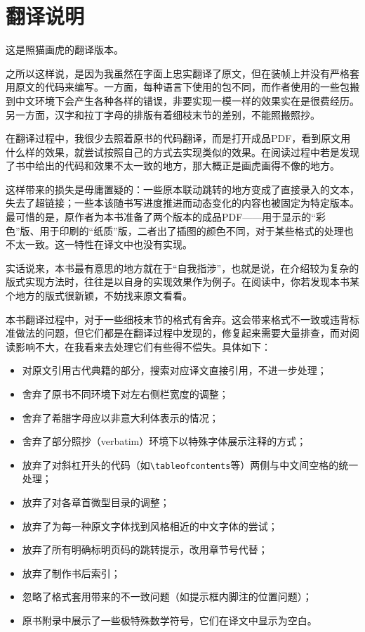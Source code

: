 \chapter*{翻译说明}

这是照猫画虎的翻译版本。

之所以这样说，是因为我虽然在字面上忠实翻译了原文，但在装帧上并没有严格套用原文的代码来编写。一方面，每种语言下使用的包不同，而作者使用的一些包搬到中文环境下会产生各种各样的错误，非要实现一模一样的效果实在是很费经历。另一方面，汉字和拉丁字母的排版有着细枝末节的差别，不能照搬照抄。

在翻译过程中，我很少去照着原书的代码翻译，而是打开成品PDF，看到原文用什么样的效果，就尝试按照自己的方式去实现类似的效果。在阅读过程中若是发现了书中给出的代码和效果不太一致的地方，那大概正是画虎画得不像的地方。

这样带来的损失是毋庸置疑的：一些原本联动跳转的地方变成了直接录入的文本，失去了超链接；一些本该随书写进度推进而动态变化的内容也被固定为特定版本。最可惜的是，原作者为本书准备了两个版本的成品PDF——用于显示的“彩色”版、用于印刷的“纸质”版，二者出了插图的颜色不同，对于某些格式的处理也不太一致。这一特性在译文中也没有实现。

实话说来，本书最有意思的地方就在于“自我指涉”，也就是说，在介绍较为复杂的版式实现方法时，往往是以自身的实现效果作为例子。在阅读中，你若发现本书某个地方的版式很新颖，不妨找来原文看看。

本书翻译过程中，对于一些细枝末节的格式有舍弃。这会带来格式不一致或违背标准做法的问题，但它们都是在翻译过程中发现的，修复起来需要大量排查，而对阅读影响不大，在我看来去处理它们有些得不偿失。具体如下：
\begin{itemize}
    \item 对原文引用古代典籍的部分，搜索对应译文直接引用，不进一步处理；
    \item 舍弃了原书不同环境下对左右侧栏宽度的调整；
    \item 舍弃了希腊字母应以非意大利体表示的情况；
    \item 舍弃了部分照抄（verbatim）环境下以特殊字体展示注释的方式；
    \item 放弃了对斜杠开头的代码（如\verb+\tableofcontents+等）两侧与中文间空格的统一处理；
    \item 放弃了对各章首微型目录的调整；
    \item 放弃了为每一种原文字体找到风格相近的中文字体的尝试；
    \item 放弃了所有明确标明页码的跳转提示，改用章节号代替；
    \item 放弃了制作书后索引；
    \item 忽略了格式套用带来的不一致问题（如提示框内脚注的位置问题）；
    \item 原书附录中展示了一些极特殊数学符号，它们在译文中显示为空白。
\end{itemize}

